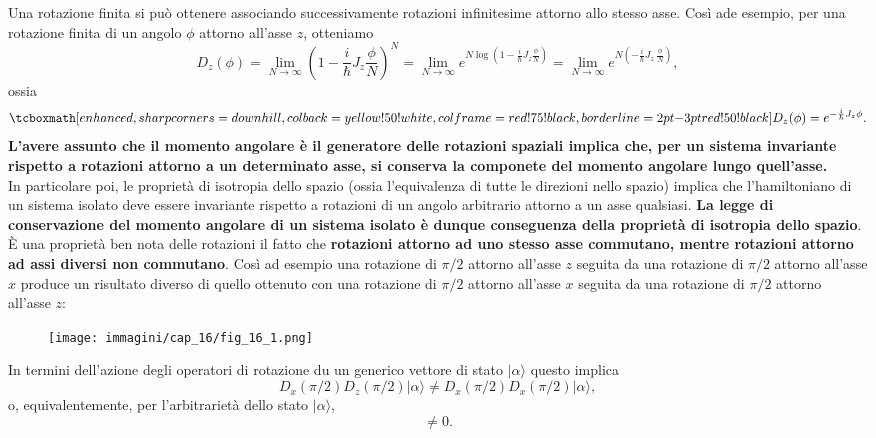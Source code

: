 \documentclass[a4paper,12pt,oneside]{book}
\begin{document}
Una rotazione finita si può ottenere associando successivamente rotazioni infinitesime attorno allo stesso asse. Così ade esempio, per una rotazione finita di un angolo $\phi$ attorno all'asse $z$, otteniamo
	\begin{equation}
		D_z (\phi) = \lim _{N\rightarrow \infty} \left(1-\frac{i}{\hbar} J_z \frac{\phi}{N}\right) ^N= \lim _{N\rightarrow \infty} e^{N\log\left(1-\frac{i}{\hbar} J_z \frac{\phi}{N}\right)}= \lim _{N\rightarrow \infty} e^{N\left(-\frac{i}{\hbar} J_z \ \frac{\phi}{N}\right)},
	\end{equation}
ossia
	\begin{equation}
		\tcboxmath[enhanced, sharp corners=downhill, colback=yellow!50!white, colframe=red!75!black, borderline={2pt}{-3pt}{red!50!black}]{
			D_z (\phi)=e^{-\frac{i}{\hbar} J_z \phi}.
			}
	\end{equation}
\textbf{L'avere assunto che il momento angolare è il generatore delle rotazioni spaziali implica che, per un sistema invariante rispetto a rotazioni attorno a un determinato asse, si conserva la componete del momento angolare lungo quell'asse.}\\

In particolare poi, le proprietà di isotropia dello spazio (ossia l'equivalenza di tutte le direzioni nello spazio) implica che l'hamiltoniano di un sistema isolato deve essere invariante rispetto a rotazioni di un angolo arbitrario attorno a un asse qualsiasi. \textbf{La legge di conservazione del momento angolare di un sistema isolato è dunque conseguenza della proprietà di isotropia dello spazio}.\\

È una proprietà ben nota delle rotazioni il fatto che \textbf{rotazioni attorno ad uno stesso asse commutano, mentre rotazioni attorno ad assi diversi non commutano}. Così ad esempio una rotazione di $\pi /2$ attorno all'asse $z$ seguita da una rotazione di $\pi /2$ attorno all'asse $x$ produce un risultato diverso di quello ottenuto con una rotazione di $\pi /2$ attorno all'asse $x$ seguita da una rotazione di $\pi /2$ attorno all'asse $z$:\\
\begin{figure}[!htbp]
\begin{center}
\texttt{[image: immagini/cap\_16/fig\_16\_1.png]}
\end{center}
\end{figure}


In termini dell'azione degli operatori di rotazione du un generico vettore di stato $\vert \alpha \rangle$ questo implica
	\begin{equation}
		D_x (\pi/2) D_z (\pi/2) \vert \alpha \rangle \neq D_x (\pi/2) D_x (\pi/2) \vert \alpha \rangle ,
	\end{equation}
o, equivalentemente, per l'arbitrarietà dello stato $\vert \alpha \rangle$,
\begin{equation}
[D_x (\pi/2); D_z (\pi/2)] \neq 0 .
\end{equation}\\
\end{document}
